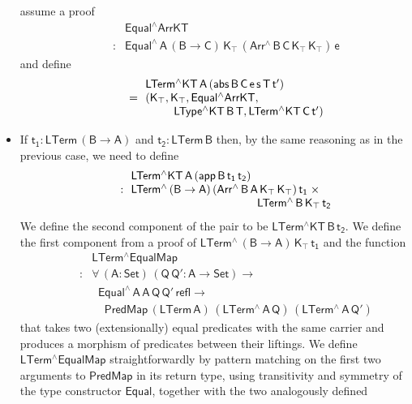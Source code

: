 \documentclass[sigplan,screen]{acmart}
\begin{document}
\begin{itemize}
assume a proof \[\begin{array}{ll}
&\!\! \mathsf{Equal^\wedge ArrKT}\\
\quad\quad  : & \!\!\mathsf{Equal^{\wedge} \, A\, (B
  \to C)\, K_\top\, (Arr^{\wedge} \, B\, C\, K_\top \, K_\top)\, e}
\end{array}\]
and define
\[\begin{array}{ll}
 & \!\!\mathsf{LTerm^\wedge KT\,A\, (abs\, B \,C \, e \,s \,T \,
  t')}\\
\quad\quad= & \!\!\mathsf{(K_\top , K_\top , Equal^\wedge ArrKT ,}\\
 & \hspace*{0.3in} \mathsf{LType^\wedge KT\, B\, T , LTerm^\wedge KT\, C\, t') }
\end{array}\]
\item If $\mathsf{t_1 : LTerm\,(B \to A)}$ and $\mathsf{t_2 :
  LTerm\,B}$ then, by the same reasoning as in the previous case, we
  need to define
  \[\begin{array}{ll}
 & \!\! \mathsf{LTerm^\wedge KT\,A\, (app\, B \, t_1\,t_2)}\\
\quad\quad : &\!\! \mathsf{LTerm^{\wedge}\, (B \to A)\, (Arr^{\wedge} \, B\, A\,
  K_\top \, K_\top)\, t_1\; \times}\\
 & \hspace*{1.5in} \mathsf{LTerm^{\wedge}\, B\, K_\top\, t_2}
  \end{array}\]
  We define the second component of the pair to be
  $\mathsf{LTerm^\wedge KT\,B\,t_2}$. We define the first
  component from a proof of $\mathsf{LTerm^{\wedge}\, (B \to A)\,
    K_\top\, t_1}$ and the function
  \[\begin{array}{ll}
  & \!\! \mathsf{LTerm^\wedge EqualMap}\\
  \quad\quad : &
  \!\!\mathsf{\forall\, (A : Set)\, (Q\,Q' : A \to
    Set) \to}\\
  & \;\;\mathsf{Equal^\wedge\,A\,A\,Q\,Q'\,refl \to}\\
  &  \;\;\;\;\mathsf{PredMap\,(LTerm\,A)\,
    (LTerm^{\wedge}\,A\,Q)\,(LTerm^{\wedge}\,A\,Q')}
  \end{array}\] that takes two
  (extensionally) equal predicates with the same carrier and produces
  a morphism of predicates between their liftings. We define
  $\mathsf{LTerm^\wedge EqualMap}$ straightforwardly by
  pattern matching on the first two arguments to $\mathsf{PredMap}$ in
  its return type, using transitivity and symmetry of the type
  constructor $\mathsf{Equal}$, together with the two analogously defined

\end{itemize}
\end{document}
